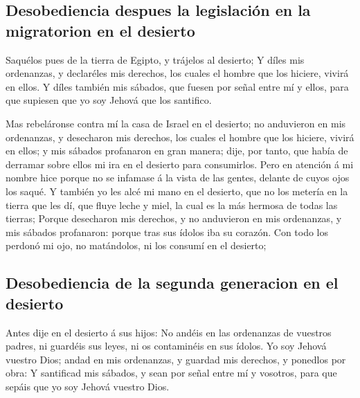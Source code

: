 \hypertarget{desobediencia-despues-la-legislaciuxf3n-en-la-migratorion-en-el-desierto}{%
\subsection{Desobediencia despues la legislación en la migratorion en el
desierto}\label{desobediencia-despues-la-legislaciuxf3n-en-la-migratorion-en-el-desierto}}

 Saquélos pues de la tierra de Egipto, y trájelos al
desierto;  Y díles mis ordenanzas, y declaréles mis
derechos, los cuales el hombre que los hiciere, vivirá en ellos.
 Y díles también mis sábados, que fuesen por señal entre
mí y ellos, para que supiesen que yo soy Jehová que los santifico.

 Mas rebeláronse contra mí la casa de Israel en el
desierto; no anduvieron en mis ordenanzas, y desecharon mis derechos,
los cuales el hombre que los hiciere, vivirá en ellos; y mis sábados
profanaron en gran manera; dije, por tanto, que había de derramar sobre
ellos mi ira en el desierto para consumirlos.  Pero en
atención á mi nombre hice porque no se infamase á la vista de las
gentes, delante de cuyos ojos los saqué.  Y también yo
les alcé mi mano en el desierto, que no los metería en la tierra que les
dí, que fluye leche y miel, la cual es la más hermosa de todas las
tierras;  Porque desecharon mis derechos, y no anduvieron
en mis ordenanzas, y mis sábados profanaron: porque tras sus ídolos iba
su corazón.  Con todo los perdonó mi ojo, no matándolos,
ni los consumí en el desierto;

\hypertarget{desobediencia-de-la-segunda-generacion-en-el-desierto}{%
\subsection{Desobediencia de la segunda generacion en el
desierto}\label{desobediencia-de-la-segunda-generacion-en-el-desierto}}

 Antes dije en el desierto á sus hijos: No andéis en las
ordenanzas de vuestros padres, ni guardéis sus leyes, ni os contaminéis
en sus ídolos.  Yo soy Jehová vuestro Dios; andad en mis
ordenanzas, y guardad mis derechos, y ponedlos por obra: 
Y santificad mis sábados, y sean por señal entre mí y vosotros, para que
sepáis que yo soy Jehová vuestro Dios.

